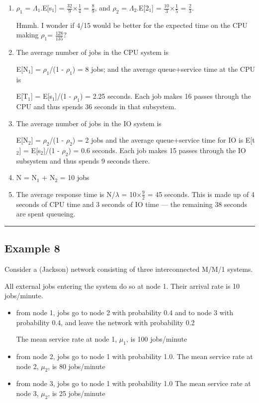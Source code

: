 \documentclass[12pt,fleqn]{report}
\begin{document}
\begin{enumerate}

\item $\rho_1$ = $\Lambda_1$.E[s$_1$] =
$\frac{32}{9}$$\times$$\frac{1}{4}$ = $\frac{8}{9}$, and
$\rho_2$ = $\Lambda_2$.E[2$_1$] =
$\frac{10}{3}$$\times$$\frac{1}{5}$ = $\frac{2}{3}$.

Hmmh. I wonder if 4/15 would be better for the 
expected time on the CPU making $\rho_1$= $\frac{128}{135}$?


\item The average number of jobs in the CPU system  is

E[N$_1$] = $\rho_1$/(1 - $\rho_1$) = 8 jobs; and
the average queue+service time at the CPU is 

E[T$_1$] = E[s$_1$]/(1 - $\rho_1$)  = 2.25 seconds.
Each job makes 16 passes through the CPU and thus spends 36 seconds in
that subsystem.

\item The average number of jobs in the IO system  is

E[N$_2$] = $\rho_2$/(1 - $\rho_2$) = 2 jobs
and the average queue+service time for IO is 
E[t$_2$] = E[s$_2$]/(1 - $\rho_2$)  = 0.6 seconds.
Each job makes 15 passes through the IO subsystem and thus spends 9
seconds there.

\item N    =  N$_1$ + N$_2$ = 10 jobs

\item The average response time is N/$\lambda$ =
10$\times$$\frac{9}{2}$ = 45 seconds.
This is made up of 4 seconds of CPU time and 3 seconds of IO time
--- the remaining 38 seconds are spent queueing.

\end{enumerate}


\noindent
\hfill{\rule{160mm}{0.5mm}}


\subsection*{Example 8}

 Consider a (Jackson) network consisting of three 
interconnected M/M/1 systems.

All external jobs entering the system do so at node 1.
Their arrival rate is 10 jobs/minute.

\begin{itemize}
\item from node 1, jobs go to node 2 with probability 0.4 
and to node 3 with probability 0.4,
and leave the network with probability 0.2 

The mean service rate at node 1, $\mu_1$, is 100 jobs/minute

\item from node 2, jobs go to node 1 with probability 1.0.
The mean service rate at node 2, $\mu_2$, is 80 jobs/minute


\item from node 3, jobs go to node 1 with probability 1.0
The mean service rate at node 3, $\mu_2$, is 25 jobs/minute
\end{itemize}
\end{document}
